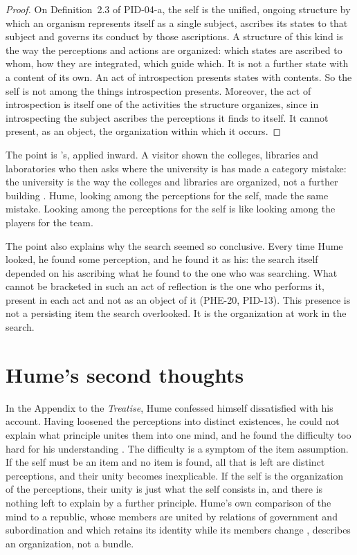 \documentclass{situationist-preprint}
\begin{document}
\begin{proof}
On Definition~2.3 of PID-04-a, the self is the unified, ongoing structure by which an organism represents itself as a single subject, ascribes its states to that subject and governs its conduct by those ascriptions. A structure of this kind is the way the perceptions and actions are organized: which states are ascribed to whom, how they are integrated, which guide which. It is not a further state with a content of its own. An act of introspection presents states with contents. So the self is not among the things introspection presents. Moreover, the act of introspection is itself one of the activities the structure organizes, since in introspecting the subject ascribes the perceptions it finds to itself. It cannot present, as an object, the organization within which it occurs.
\end{proof}

The point is \citeauthor{Ryle1949}'s, applied inward. A visitor shown the colleges, libraries and laboratories who then asks where the university is has made a category mistake: the university is the way the colleges and libraries are organized, not a further building \citep[ch.~1]{Ryle1949}. Hume, looking among the perceptions for the self, made the same mistake. Looking among the perceptions for the self is like looking among the players for the team.

The point also explains why the search seemed so conclusive. Every time Hume looked, he found some perception, and he found it as his: the search itself depended on his ascribing what he found to the one who was searching. What cannot be bracketed in such an act of reflection is the one who performs it, present in each act and not as an object of it (PHE-20, PID-13). This presence is not a persisting item the search overlooked. It is the organization at work in the search.

\section{Hume's second thoughts}

In the Appendix to the \emph{Treatise}, Hume confessed himself dissatisfied with his account. Having loosened the perceptions into distinct existences, he could not explain what principle unites them into one mind, and he found the difficulty too hard for his understanding \citep[Appendix]{Hume1739}. The difficulty is a symptom of the item assumption. If the self must be an item and no item is found, all that is left are distinct perceptions, and their unity becomes inexplicable. If the self is the organization of the perceptions, their unity is just what the self consists in, and there is nothing left to explain by a further principle. Hume's own comparison of the mind to a republic, whose members are united by relations of government and subordination and which retains its identity while its members change \citep[1.4.6]{Hume1739}, describes an organization, not a bundle.
\end{document}
